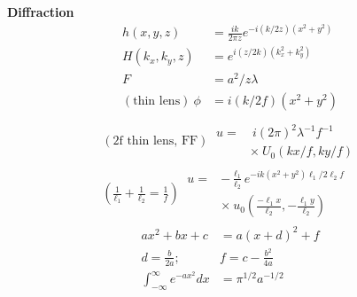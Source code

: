 \documentclass[12pt]{article}
\begin{document}
\begin{multicols}{2}
\textbf{Diffraction}
\begin{align}
  h(x, y, z) &= \frac{ik}{2\pi z} e^{-i (k / 2z)(x^2 + y^2)}\\
  H(k_x, k_y, z) &= e^{i (z / 2k)(k_x^2 + k_y^2)}\\
  F &= a^2 / z \lambda\\
  (\textrm{thin lens}) \ \phi &= i(k/2f)(x^2+y^2)\\
\end{align}
\begin{align}
  (\textrm{2f thin lens, FF}) \
  \begin{aligned}
    u = &\ i(2\pi)^2\lambda^{-1}f^{-1}\\
    &\times \ U_0(kx/f,ky/f)
  \end{aligned}\\
  (\frac{1}{\ell_1} + \frac{1}{\ell_2} = \frac{1}{f}) \
  \begin{aligned}
    u = &-\frac{\ell_1}{\ell_2} e^{-ik(x^2+y^2)\ell_1/2\ell_2 f}\\
    &\times \ u_0(\frac{-\ell_1 x}{\ell_2}, -\frac{\ell_1 y}{\ell_2})
  \end{aligned}
\end{align}
\begin{align}
  ax^2 + bx + c &= a(x + d)^2 + f\\
  d = \frac{b}{2a}; \ &f = c - \frac{b^2}{4a}\\
  \int_{-\infty}^{\infty} e^{-ax^2} dx &= \pi^{1/2}a^{-1/2}
\end{align}


\end{multicols}
\end{document}
